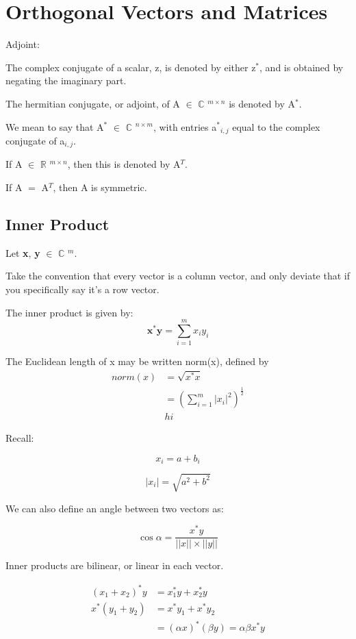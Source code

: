 \documentclass[12pt]{article}
\newcommand{\mt}[1]{\ensuremath{#1}}
\newcommand\bsc[2][\DefaultOpt]{%
  \def\DefaultOpt{#2}%
  \section[#1]{#2}%
}
\newcommand\ssc[2][\DefaultOpt]{%
  \def\DefaultOpt{#2}%
  \subsection[#1]{#2}%
}
\newcommand{\br}{\mt{\mathbb{R}} }       %
\newcommand{\bc}{\mt{\mathbb{C}} }       %
\newcommand{\mem}{\mt{\in} }
\newcommand{\eql}{\mt{=} }
\newcommand{\uw}[2]{#1\mt{_{#2}}}
\newcommand{\uf}[2]{#1\mt{^{#2}}}
\newcommand{\splt}[1]{\begin{split}#1\end{split}}
\begin{document}
\bsc{Orthogonal Vectors and Matrices} {

Adjoint: 

The complex conjugate of a scalar, z, is denoted by either \uf{z}{*}, and is obtained by negating the imaginary part.

The hermitian conjugate, or adjoint, of A \mem \uf{\bc}{m \times n} is denoted by \uf{A}{*}.

We mean to say that \uf{A}{*} \mem \uf{\bc}{n \times m}, with entries \uw{\uf{a}{*}}{i, j} equal to the complex conjugate of \uw{a}{i, j}.

If A \mem \uf{\br}{m \times n}, then this is denoted by \uf{A}{T}.

If A \eql \uf{A}{T}, then A is symmetric.

\ssc{Inner Product}{

Let \textbf{x}, \textbf{y} \mem \uf{\bc}{m}.

Take the convention that every vector is a column vector, and only deviate that if you specifically say it's a row vector.

The inner product is given by:
\begin{displaymath}
  \textbf{x}^*\textbf{y} = \sum_{i = 1}^m x_i y_i
\end{displaymath}

The Euclidean length of x may be written norm(x), defined by
\begin{displaymath}
	\splt{
		norm(x) & = \sqrt{x^* x} \\
  		& = ( \sum_{i = 1}^m |x_i|^2)^\frac{1}{2} \\
  		& hi
		}
\end{displaymath}

Recall: 

\begin{displaymath}
  x_i = a + b_i
\end{displaymath}

\begin{displaymath}
  |x_i| = \sqrt{a^2 + b^2}
\end{displaymath}

We can also define an angle between two vectors as:

\begin{displaymath}
  \cos \alpha = \frac{x^* y}{||x||\times ||y||}
\end{displaymath}

}

Inner products are bilinear, or linear in each vector.

\begin{displaymath}
  \splt{ (x_1 + x_2)^* y & = x_1^* y + x_2^* y \\
  	x^*(y_1 + y_2) & = x^*y_1 + x^* y_2 \\
  	& = (\alpha x)^* (\beta y) = \alpha \beta x^*y
  }
\end{displaymath}

}
\end{document}
